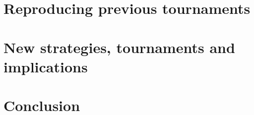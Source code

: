 \documentclass{article}
\begin{document}
\section{Reproducing previous tournaments}\label{sec:reproducing-previous-tournaments}

\section{New strategies, tournaments and implications}\label{sec:new-strategies-and-implications}

\section{Conclusion}\label{sec:conclusion}

\printbibliography
\end{document}
